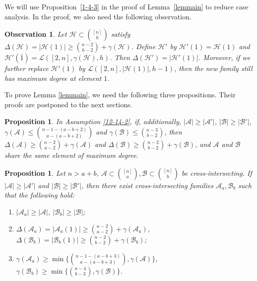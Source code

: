 \documentclass[11pt]{article}
\newcommand{\m}{\mathcal}
\newtheorem{proposition}[theorem]{Proposition}
\newtheorem{obser}[theorem]{Observation}
\begin{document}
We will use Proposition~\ref{1-4-3} in the proof of Lemma~\ref{lemmain} to reduce case analysis.
In the proof, we also need the following observation.
\begin{obser}\label{11-27-1}
Let $\mathcal{H}\subset {[n]\choose h}$ satisfy $\Delta(\mathcal{H})=|\mathcal{H}(1)|\ge {n-2\choose h-2}+\gamma(\mathcal{H})$. Define $\mathcal{H}'$ by 
$\mathcal{H}'(1)=\mathcal{H}(1)$ and $\mathcal{H}'(\bar{1})=\mathcal{L}([2,n], \gamma(\mathcal{H}), h)$.
Then $\Delta(\mathcal{H}')=|\mathcal{H}'(1)|$. 
Moreover, if we further replace $\mathcal{H}'(1)$ by $\mathcal{L}([2,n], |\mathcal{H}(1)|, h-1)$, then the new family still has maximum degree at element $1$. 
\end{obser}

To prove Lemma \ref{lemmain}, we need the following three propositions. Their  proofs are postponed to the next sections. 

\begin{proposition}\label{12-15-1}
In Assumption \ref{12-14-2}, if, additionally, $|\mathcal{A}|\ge |\mathcal{A}'|$, $|\mathcal{B}|\ge |\mathcal{B}'|$, $\gamma(\mathcal{A})\le {n-1-(a-b+2)\choose a-(a-b+2)}$ and $\gamma(\mathcal{B})\le {n-3\choose b-2}$, then 
$\Delta(\mathcal{A})\ge {n-2\choose a-2}+\gamma(\mathcal{A})$ and $\Delta(\mathcal{B})\ge {n-2\choose b-2}+\gamma(\mathcal{B})$, and $\mathcal{A}$ and $\mathcal{B}$ share the same element of maximum degree.
\end{proposition}

\begin{proposition}\label{11-29-1}
Let $n>a+b$, $\m A \subset {[n]\choose a}, \m B \subset {[n]\choose b}$ be cross-intersecting. If $|\mathcal{A}|\ge |\mathcal{A}'|$ and $|\mathcal{B}|\ge |\mathcal{B}'|$, then there exist cross-intersecting families $\mathcal{A}_a, \mathcal{B}_b$ such that the following hold:
\begin{enumerate}
\item $|\mathcal{A}_a|\ge |\mathcal{A}|$, $|\mathcal{B}_b|\ge |\mathcal{B}|$;
\item $\Delta(\mathcal{A}_a)=|\m A_a(1)|\ge {n-2\choose a-2}+\gamma(\mathcal{A}_a)$, $\Delta(\mathcal{B}_b)=|\m B_b(1)|\ge {n-2\choose b-2}+\gamma(\mathcal{B}_b)$;
\item $\gamma(\mathcal{A}_a) \ge \min \{{n-1-(a-b+3)\choose a-(a-b+3)}, \gamma(\mathcal{A})\}$,
 $\gamma(\mathcal{B}_b) \ge \min \{{n-4\choose b-3}, \gamma(\mathcal{B})\} $.
\end{enumerate}
\end{proposition}
\end{document}
